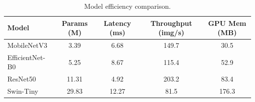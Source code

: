 \begin{table}[h]
\centering
\caption{Model efficiency comparison.}
\label{tab:efficiency}
\begin{tabular}{lcccc}
\toprule
Model & Params (M) & Latency (ms) & Throughput (img/s) & GPU Mem (MB) \\
\midrule
MobileNetV3 & 3.39 & 6.68 & 149.7 & 30.5 \\
EfficientNet-B0 & 5.25 & 8.67 & 115.4 & 52.9 \\
ResNet50 & 11.31 & 4.92 & 203.2 & 83.4 \\
Swin-Tiny & 29.83 & 12.27 & 81.5 & 176.3 \\
\bottomrule
\end{tabular}
\end{table}